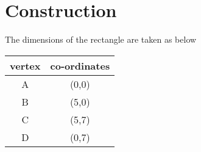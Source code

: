 \documentclass[journal,10pt,twocolumn]{article}
\begin{document}
\section*{Construction}
The dimensions of the rectangle are taken as below\\
{
\setlength\extrarowheight{2pt}
\centering
	\begin{tabular}{|c|c|}
	\hline
	\textbf{vertex}&\textbf{co-ordinates}\\
	\hline
	A&(0,0)\\
	\hline
	B&(5,0)\\
	\hline
	C&(5,7)\\
	\hline
	D&(0,7)\\
	\hline
\end{tabular}
}
\end{document}
